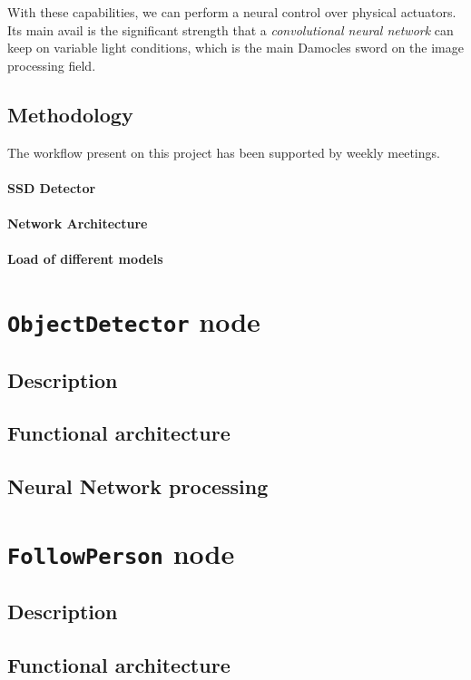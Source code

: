 With these capabilities, we can perform a neural control over physical actuators. Its main avail is the significant strength that a \emph{convolutional neural network} can keep on variable light conditions, which is the main Damocles sword on the image processing field.

\section{Methodology}
The workflow present on this project has been supported by weekly meetings.

\subsubsection{SSD Detector}
\subsubsection{Network Architecture}
\subsubsection{Load of different models}


\chapter{\texttt{ObjectDetector} node}
\section{Description}
\section{Functional architecture}
\section{Neural Network processing}


\chapter{\texttt{FollowPerson} node}
\section{Description}
\section{Functional architecture}

